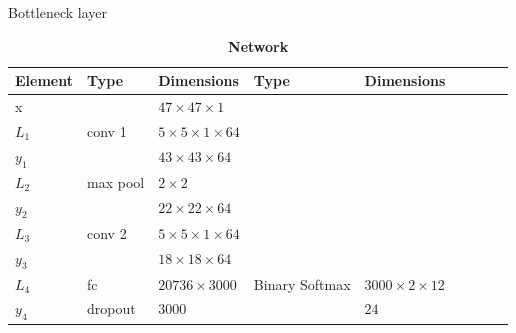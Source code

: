 \begin{table}[h!]
{		\caption{ \newline *Bottleneck layer} \label{tab:netII}
	}
\end{table}

\begin{table}[h!]
	\centering
	\caption*{\textbf{Network \networkIII}}
	{\footnotesize
		\begin{tabular}{|lllllllll|}
			\hline
			\multicolumn{1}{|l|}{Element} & Type             & \multicolumn{1}{l|}{Dimensions}                  & Type           & \multicolumn{1}{l|}{Dimensions}            \\ \hline
			\multicolumn{1}{|l|}{x}       &                  & \multicolumn{1}{l|}{$47\times47\times1$}         &                & \multicolumn{1}{l|}{}                      \\ \hline

			\multicolumn{1}{|l|}{$L_1$}   & conv 1           & \multicolumn{1}{l|}{$5\times 5\times1\times 64$} &                & \multicolumn{1}{l|}{}                      \\
			\multicolumn{1}{|l|}{$y_1$}   &                  & \multicolumn{1}{l|}{$43\times43\times64$}        &                & \multicolumn{1}{l|}{}                      \\ \hline

			\multicolumn{1}{|l|}{$L_2$}   & max pool         & \multicolumn{1}{l|}{$2\times 2$}                 &                & \multicolumn{1}{l|}{}                      \\
			\multicolumn{1}{|l|}{$y_2$}   &                  & \multicolumn{1}{l|}{$22\times22\times 64$}       &                & \multicolumn{1}{l|}{}                      \\ \hline

			\multicolumn{1}{|l|}{$L_3$}   & conv 2           & \multicolumn{1}{l|}{$5\times 5\times1\times 64$} &                & \multicolumn{1}{l|}{}                      \\
			\multicolumn{1}{|l|}{$y_3$}   &                  & \multicolumn{1}{l|}{$18\times18\times64$}        &                & \multicolumn{1}{l|}{}                      \\ \hline

			\multicolumn{1}{|l|}{$L_4$}   & fc               & \multicolumn{1}{l|}{$20736\times3000$}           & Binary Softmax & \multicolumn{1}{l|}{$3000\times2\times12$} \\
			\multicolumn{1}{|l|}{$y_4$}   & dropout          & \multicolumn{1}{l|}{$3000$}                      &                & \multicolumn{1}{l|}{$24$}                  \\ \hline


\end{tabular}}
\end{table}
